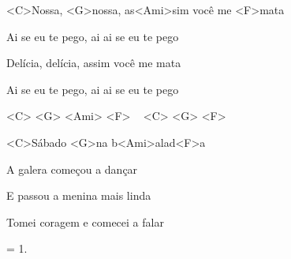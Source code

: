 
\zr

<C>Nossa, <G>nossa,
as<Ami>sim você me <F>mata

Ai se eu te pego,
ai ai se eu te pego

Delícia, delícia,
assim você me mata

Ai se eu te pego,
ai ai se eu te pego
\kr


<C> <G> <Ami> <F> ~ <C> <G> <F>

\zs
<C>Sábado <G>na b<Ami>alad<F>a

A galera começou a dançar

E passou a menina mais linda

Tomei coragem e comecei a falar
\ks

\zr \kr

\zs
= 1.
\ks

\zr \kr

\zr \kr

\kp

